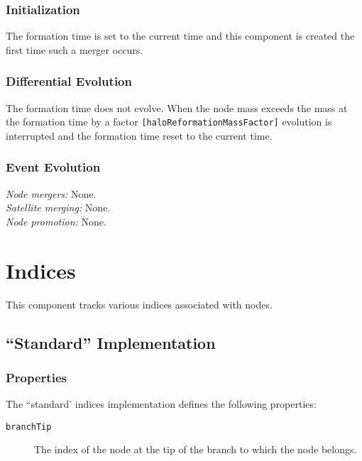 \subsubsection{Initialization}

The formation time is set to the current time and this \gls{component} is created the first time such a merger occurs.

\subsubsection{Differential Evolution}

The formation time does not evolve. When the \gls{node} mass exceeds the mass at the formation time by a factor {\tt [haloReformationMassFactor]} evolution is interrupted and the formation time reset to the current time.

\subsubsection{Event Evolution}

\noindent\emph{Node mergers:} None.\\

\noindent\emph{Satellite merging:} None.\\

\noindent\emph{Node promotion:} None.\\

\section{Indices}\label{sec:ComponentIndices}

This \gls{component} tracks various indices associated with nodes.

\subsection{``Standard'' Implementation}

\subsubsection{Properties}

The ``standard' indices implementation defines the following properties:
\begin{description}
 \item [{\tt branchTip}] The index of the node at the tip of the branch to which the node belongs.
\end{description}

